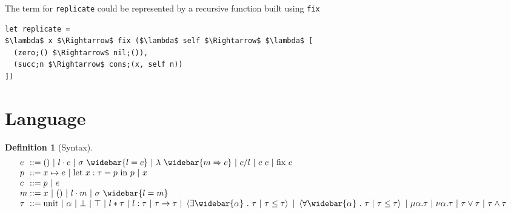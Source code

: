 \documentclass[manuscript]{acmart}
\theoremstyle{definition}
\newtheorem{definition}{Definition}[section]
\begin{document}
\noindent The term for \lstinline{replicate} could be represented by a recursive function built using \lstinline{fix} 

\begin{lstlisting}[]
let replicate = 
$\lambda$ x $\Rightarrow$ fix ($\lambda$ self $\Rightarrow$ $\lambda$ [
  (zero;() $\Rightarrow$ nil;()),
  (succ;n $\Rightarrow$ cons;(x, self n))
]) 
\end{lstlisting}


\section{Language}

\begin{definition}[Syntax]
\[
  \begin{array}{l @{} l}
    e 
    &{} ::=
    \begin{array}[t]{@{} l}
      () 
      \ |\ 
      l \cdot c 
      \ |\ 
      \sigma\ \widebar{l = c}
      \ |\ 
      \lambda\ \widebar{m \Rightarrow c} 
      \ |\ 
      c/l
      \ |\ 
      c\ c 
      \ |\ 
      \text{fix}\ c
    \end{array}
    \\
    p 
    &{} ::=
    \begin{array}[t]{@{} l}
      x \mapsto e
      \ |\ 
      \text{let}\ x : \tau = p\ \text{in}\ p 
      \ |\ 
      x
    \end{array}
    \\
    c 
    &{} ::=
    \begin{array}[t]{@{} l}
      p
      \ |\ 
      e
    \end{array}
    \\
    m 
    &{} ::=
    \begin{array}[t]{@{} l}
      x 
      \ |\ 
      () 
      \ |\ 
      l \cdot m 
      \ |\ 
      \sigma\ \widebar{l = m}
    \end{array}
    \\
    \tau
    &{} ::=
    \begin{array}[t]{@{} l}
      \text{unit} 
      \ |\ 
      \alpha 
      \ |\ 
      \bot 
      \ |\ 
      \top 
      \ |\ 
      l*\tau 
      \ |\ 
      l:\tau 
      \ |\ 
      \tau\rightarrow\tau 
      \ |\ 
      \left<\exists \widebar{\alpha}\ .\ \tau\ |\ \tau \leq \tau\right>
      \ |\ 
      \left<\forall \widebar{\alpha}\ .\ \tau\ |\ \tau \leq \tau\right>
      \ |\ 
      \mu \alpha.\tau 
      \ |\ 
      \nu \alpha.\tau 
      \ |\ 
      \tau \vee \tau
      \ |\ 
      \tau \wedge \tau
    \end{array}
  \end{array}
\]

\end{definition}
\end{document}
